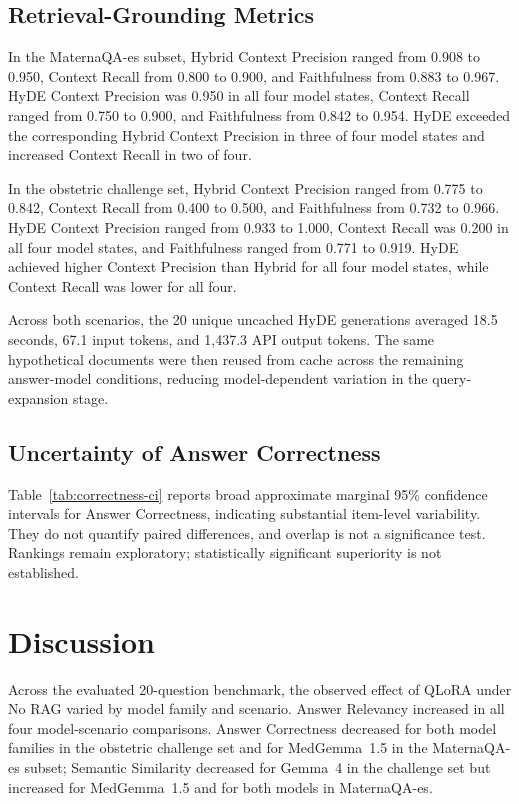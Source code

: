 \subsection{Retrieval-Grounding Metrics}
In the MaternaQA-es subset, Hybrid Context Precision ranged from 0.908 to
0.950, Context Recall from 0.800 to 0.900, and Faithfulness from 0.883 to
0.967. HyDE Context Precision was 0.950 in all four model states, Context
Recall ranged from 0.750 to 0.900, and Faithfulness from 0.842 to 0.954.
HyDE exceeded the corresponding Hybrid Context Precision in three of four
model states and increased Context Recall in two of four.

In the obstetric challenge set, Hybrid Context Precision ranged from 0.775
to 0.842, Context Recall from 0.400 to 0.500, and Faithfulness from 0.732
to 0.966. HyDE Context Precision ranged from 0.933 to 1.000, Context Recall
was 0.200 in all four model states, and Faithfulness ranged from 0.771 to
0.919. HyDE achieved higher Context Precision than Hybrid for all four model
states, while Context Recall was lower for all four.

Across both scenarios, the 20 unique uncached HyDE generations averaged
18.5 seconds, 67.1 input tokens, and 1,437.3 API output tokens. The same
hypothetical documents were then reused from cache across the remaining
answer-model conditions, reducing model-dependent variation in the
query-expansion stage.

\subsection{Uncertainty of Answer Correctness}
Table~\ref{tab:correctness-ci} reports broad approximate marginal 95\%
confidence intervals for Answer Correctness, indicating substantial
item-level variability. They do not quantify paired differences, and overlap
is not a significance test. Rankings remain exploratory; statistically
significant superiority is not established.

\section{Discussion}
Across the evaluated 20-question benchmark, the observed effect of QLoRA
under No RAG varied by model family and scenario. Answer Relevancy increased
in all four model-scenario comparisons. Answer Correctness decreased for both
model families in the obstetric challenge set and for MedGemma~1.5 in the
MaternaQA-es subset; Semantic Similarity decreased for Gemma~4 in the challenge
set but increased for MedGemma~1.5 and for both models in MaternaQA-es.

